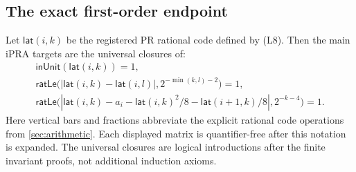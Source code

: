\subsection{The exact first-order endpoint}

Let \(\mathsf{lat}(i,k)\) be the registered PR rational code defined
by (L8). Then the main iPRA targets are the universal closures of:
\[
 \begin{gathered}
 \mathsf{inUnit}(\mathsf{lat}(i,k))=1,\\
 \mathsf{ratLe}\bigl(
   |\mathsf{lat}(i,k)-\mathsf{lat}(i,l)|,
   2^{-\min(k,l)-2}\bigr)=1,\\
 \mathsf{ratLe}\bigl(
   |\mathsf{lat}(i,k)-a_i-\mathsf{lat}(i,k)^2/8
                            -\mathsf{lat}(i+1,k)/8|,
   2^{-k-4}\bigr)=1.
 \end{gathered}
\]
Here vertical bars and fractions abbreviate the explicit rational
code operations from \cref{sec:arithmetic}. Each displayed matrix
is quantifier-free after this notation is expanded. The universal
closures are logical introductions after the finite invariant
proofs, not additional induction axioms.
